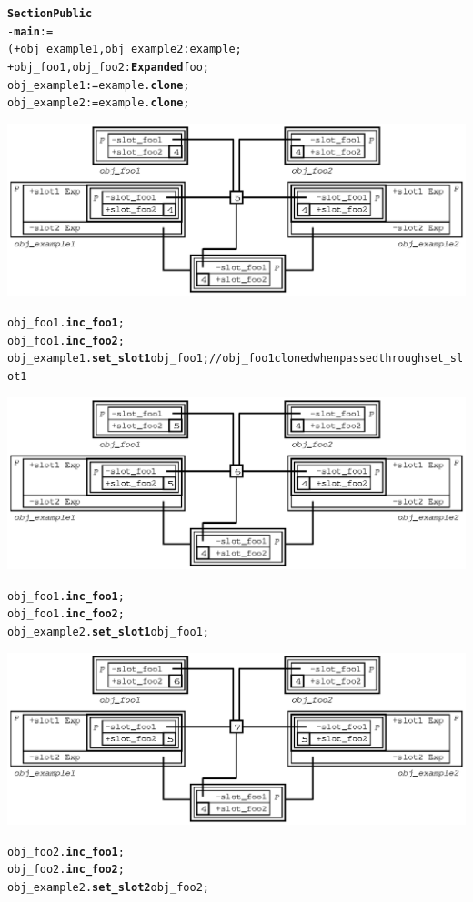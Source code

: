 \documentclass[11pt]{mybook}
\begin{document}
\begin{alltt}
{\bf{}Section Public}
  - {\bf{}main} := 
  ( + obj_example1,obj_example2:{\sc{}example};
    + obj_foo1,obj_foo2:{\bf{}Expanded} {\sc{}foo};
    obj_example1 := {\sc{}example}.{\bf{}clone};
    obj_example2 := {\sc{}example}.{\bf{}clone};
\begin{center}
\includegraphics[scale=1.0]{figures/expanded_slot3}
\end{center}
    obj_foo1.{\bf{}inc\_foo1};
    obj_foo1.{\bf{}inc\_foo2};
    obj_example1.{\bf{}set\_slot1} obj_foo1; // obj\_foo1 cloned when passed through {\sc{}set\_slot1}
\begin{center}
\includegraphics[scale=1.0]{figures/expanded_slot4}
\end{center}
   obj_foo1.{\bf{}inc\_foo1};
   obj_foo1.{\bf{}inc\_foo2};
   obj_example2.{\bf{}set\_slot1} obj_foo1;
\begin{center}
\includegraphics[scale=1.0]{figures/expanded_slot5}
\end{center}
   obj_foo2.{\bf{}inc\_foo1};
   obj_foo2.{\bf{}inc\_foo2};
   obj_example2.{\bf{}set\_slot2} obj_foo2;

\end{alltt}
\end{document}
